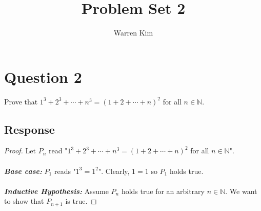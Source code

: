 \documentclass[13pt]{article}
\title{Problem Set 2}
\author{Warren Kim}
\begin{document}
\maketitle

\newpage
\section*{Question 2}
Prove that $1^3 + 2^3 + \cdots + n^3 = (1 + 2 + \cdots + n)^2$ for all $n \in \mathbb{N}$.
\subsection*{Response}
\begin{proof}
  Let $P_n$ read "$1^3 + 2^3 + \cdots + n^3 = (1 + 2 + \cdots + n)^2$ for all $n \in \mathbb{N}$". \\ \\
  \textit{\textbf{Base case:}} $P_1$ reads "$1^3 = 1^2$". Clearly, $1 = 1$ so $P_1$ holds true. \\ \\
  \textit{\textbf{Inductive Hypothesis:}} Assume $P_n$ holds true for an arbitrary $n \in \mathbb{N}$.
  We want to show that $P_{n + 1}$ is true.


\end{proof}
\end{document}
